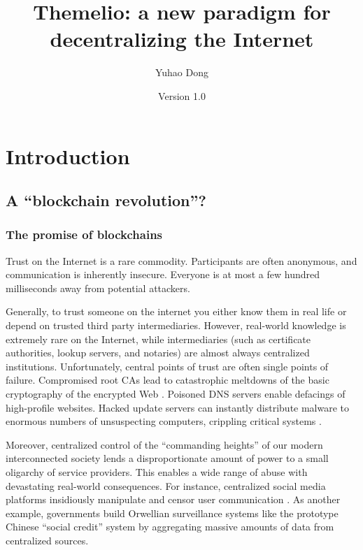 \documentclass[headinclude,12pt]{scrbook}
\begin{document}
\raggedbottom
\title{Themelio: a new paradigm for decentralizing the Internet}
\author{Yuhao Dong}
\date{Version 1.0}
\maketitle



\tableofcontents


\chapter{Introduction}

\section{A ``blockchain revolution''?}

\subsection{The promise of blockchains}

Trust on the Internet is a rare commodity. Participants are often anonymous, and communication is inherently insecure. Everyone is at most a few hundred milliseconds away from potential attackers.

Generally, to trust someone on the internet you either know them in real life or depend on trusted third party intermediaries. However, real-world knowledge is extremely rare on the Internet, while intermediaries (such as certificate authorities, lookup servers, and notaries) are almost always centralized institutions. Unfortunately, central points of trust are often single points of failure. Compromised root CAs lead to catastrophic meltdowns of the basic cryptography of the encrypted Web \cite{prins2011diginotar}. Poisoned DNS servers enable defacings of high-profile websites. Hacked update servers can instantly distribute malware to enormous numbers of unsuspecting computers, crippling critical systems \cite{richardson2017ransomware}.

Moreover, centralized control of the ``commanding heights'' of our modern interconnected society lends a disproportionate amount of power to a small oligarchy of service providers. This enables a wide range of abuse with devastating real-world consequences. For instance, centralized social media platforms insidiously manipulate and censor user communication \cite{sunstein2018republic}. As another example, governments build Orwellian surveillance systems like the prototype Chinese ``social credit'' system \cite{wang11china} by aggregating massive amounts of data from centralized sources.
\end{document}
